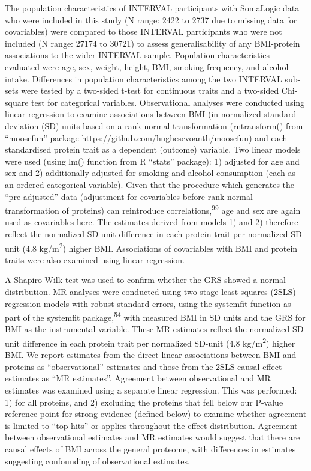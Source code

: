 \documentclass[11pt,twoside]{bristolthesis}
\begin{document}
The population characteristics of INTERVAL participants with SomaLogic data who were included in this study (N range: 2422 to 2737 due to missing data for covariables) were compared to those INTERVAL participants who were not included (N range: 27174 to 30721) to assess generalisability of any BMI-protein associations to the wider INTERVAL sample. Population characteristics evaluated were age, sex, weight, height, BMI, smoking frequency, and alcohol intake. Differences in population characteristics among the two INTERVAL sub-sets were tested by a two-sided t-test for continuous traits and a two-sided Chi-square test for categorical variables. Observational analyses were conducted using linear regression to examine associations between BMI (in normalized standard deviation (SD) units based on a rank normal transformation (rntransform() from ``moosefun'' package \url{https://github.com/hughesevoanth/moosefun}) and each standardised protein trait as a dependent (outcome) variable. Two linear models were used (using lm() function from R ``stats'' package): 1) adjusted for age and sex and 2) additionally adjusted for smoking and alcohol consumption (each as an ordered categorical variable). Given that the procedure which generates the ``pre-adjusted'' data (adjustment for covariables before rank normal transformation of proteins) can reintroduce correlations,\textsuperscript{99} age and sex are again used as covariables here. The estimates derived from models 1) and 2) therefore reflect the normalized SD-unit difference in each protein trait per normalized SD-unit (4.8 kg/m\textsuperscript{2}) higher BMI. Associations of covariables with BMI and protein traits were also examined using linear regression.

A Shapiro-Wilk test was used to confirm whether the GRS showed a normal distribution. MR analyses were conducted using two-stage least squares (2SLS) regression models with robust standard errors, using the systemfit function as part of the systemfit package,\textsuperscript{54} with measured BMI in SD units and the GRS for BMI as the instrumental variable. These MR estimates reflect the normalized SD-unit difference in each protein trait per normalized SD-unit (4.8 kg/m\textsuperscript{2}) higher BMI. We report estimates from the direct linear associations between BMI and proteins as ``observational'' estimates and those from the 2SLS causal effect estimates as ``MR estimates''. Agreement between observational and MR estimates was examined using a separate linear regression. This was performed: 1) for all proteins, and 2) excluding the proteins that fell below our P-value reference point for strong evidence (defined below) to examine whether agreement is limited to ``top hits'' or applies throughout the effect distribution. Agreement between observational estimates and MR estimates would suggest that there are causal effects of BMI across the general proteome, with differences in estimates suggesting confounding of observational estimates.
\end{document}
